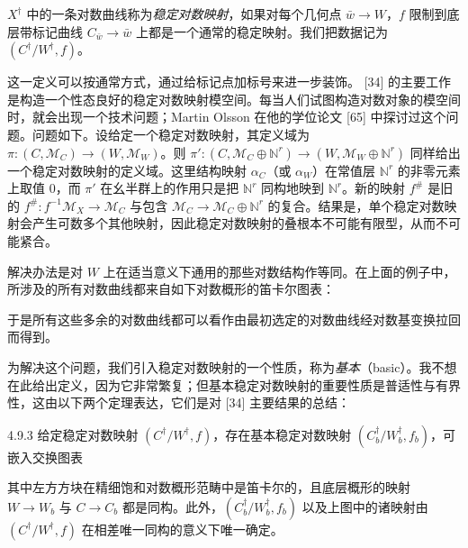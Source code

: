$X^\dagger$ 中的一条对数曲线称为\emph{稳定对数映射}，如果对每个几何点 $\bar w\to W$，$f$ 限制到底层带标记曲线 $C_{\bar w}\to\bar w$ 上都是一个通常的稳定映射。我们把数据记为 $(C^\dagger/W^\dagger,f)$。

这一定义可以按通常方式，通过给标记点加标号来进一步装饰。
[34] 的主要工作是构造一个性态良好的稳定对数映射模空间。每当人们试图构造对数对象的模空间时，就会出现一个技术问题；Martin Olsson 在他的学位论文 [65] 中探讨过这个问题。问题如下。设给定一个稳定对数映射，其定义域为 $\pi:(C,\mathcal{M}_C)\to(W,\mathcal{M}_W)$。则 $\pi':(C,\mathcal{M}_C\oplus\mathbb{N}^r)\to(W,\mathcal{M}_W\oplus\mathbb{N}^r)$ 同样给出一个稳定对数映射的定义域。这里结构映射 $\alpha_C$（或 $\alpha_W$）在常值层 $\mathbb{N}^r$ 的非零元素上取值 $0$，而 $\pi'$ 在幺半群上的作用只是把 $\mathbb{N}^r$ 同构地映到 $\mathbb{N}^r$。新的映射 $f^\#$ 是旧的 $f^\#:f^{-1}\mathcal{M}_X\to\mathcal{M}_C$ 与包含 $\mathcal{M}_C\to\mathcal{M}_C\oplus\mathbb{N}^r$ 的复合。结果是，单个稳定对数映射会产生可数多个其他映射，因此稳定对数映射的叠根本不可能有限型，从而不可能紧合。

解决办法是对 $W$ 上在适当意义下通用的那些对数结构作等同。在上面的例子中，所涉及的所有对数曲线都来自如下对数概形的笛卡尔图表：
\begin{center}
\end{center}
于是所有这些多余的对数曲线都可以看作由最初选定的对数曲线经对数基变换拉回而得到。

为解决这个问题，我们引入稳定对数映射的一个性质，称为\emph{基本}（basic）。我不想在此给出定义，因为它非常繁复；但基本稳定对数映射的重要性质是普适性与有界性，这由以下两个定理表达，它们是对 [34] 主要结果的总结：

\begin{theorem}{4.9.3}
给定稳定对数映射 $(C^\dagger/W^\dagger,f)$，存在基本稳定对数映射 $(C_b^\dagger/W_b^\dagger,f_b)$，可嵌入交换图表
\begin{center}
\end{center}
其中左方方块在精细饱和对数概形范畴中是笛卡尔的，且底层概形的映射 $W\to W_b$ 与 $C\to C_b$ 都是同构。此外，$(C_b^\dagger/W_b^\dagger,f_b)$ 以及上图中的诸映射由 $(C^\dagger/W^\dagger,f)$ 在相差唯一同构的意义下唯一确定。
\end{theorem}

